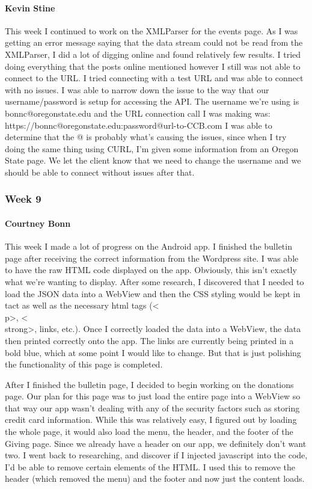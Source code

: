 			\paragraph{Kevin Stine}
			This week I continued to work on the XMLParser for the events page. As I was getting an error message saying that the data stream could not be read from the XMLParser, I did a lot of digging online and found relatively few results. I tried doing everything that the posts online mentioned however I still was not able to connect to the URL. I tried connecting with a test URL and was able to connect with no issues. I was able to narrow down the issue to the way that our username/password is setup for accessing the API. The username we're using is bonnc@oregonstate.edu and the URL connection call I was making was: https://bonnc@oregonstate.edu:password@url-to-CCB.com I was able to determine that the @ is probably what's causing the issues, since when I try doing the same thing using CURL, I'm given some information from an Oregon State page. We let the client know that we need to change the username and we should be able to connect without issues after that.
		
		\subsubsection{Week 9}
		
			\paragraph{Courtney Bonn}
			This week I made a lot of progress on the Android app. I finished the bulletin page after receiving the correct information from the Wordpress site. I was able to have the raw HTML code displayed on the app. Obviously, this isn't exactly what we're wanting to display. After some research, I discovered that I needed to load the JSON data into a WebView and then the CSS styling would be kept in tact as well as the necessary html tags (<\\p>, <\\strong>, links, etc.). Once I correctly loaded the data into a WebView, the data then printed correctly onto the app. The links are currently being printed in a bold blue, which at some point I would like to change. But that is just polishing the functionality of this page is completed.

After I finished the bulletin page, I decided to begin working on the donations page. Our plan for this page was to just load the entire page into a WebView so that way our app wasn't dealing with any of the security factors such as storing credit card information. While this was relatively easy, I figured out by loading the whole page, it would also load the menu, the header, and the footer of the Giving page. Since we already have a header on our app, we definitely don't want two. I went back to researching, and discover if I injected javascript into the code, I'd be able to remove certain elements of the HTML. I used this to remove the header (which removed the menu) and the footer and now just the content loads.

